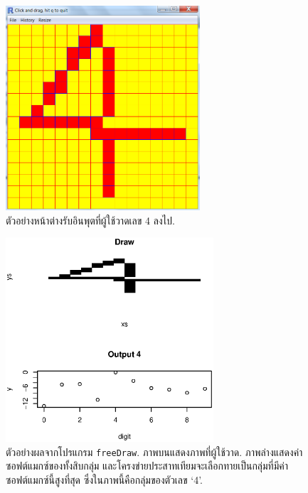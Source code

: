 %
\begin{figure}
\begin{center}
\includegraphics[height=3in]{04ANNAppImg/freeDrawPad.png}
\end{center}
\caption{ตัวอย่างหน้าต่างรับอินพุตที่ผู้ใช้วาดเลข 4 ลงไป.}
\label{fig: ANN freedraw pad}
\end{figure}
%

%
\begin{figure}
\begin{center}
\includegraphics[height=3in]{04ANNAppImg/freeDrawResult.eps}
\end{center}
\caption{ตัวอย่างผลจากโปรแกรม \texttt{freeDraw}. 
ภาพบนแสดงภาพที่ผู้ใช้วาด.
ภาพล่างแสดงค่าซอฟต์แมกซ์ของทั้งสิบกลุ่ม และโครงข่ายประสาทเทียมจะเลือกทายเป็นกลุ่มที่มีค่าซอฟต์แมกซ์นี้สูงที่สุด ซึ่งในภาพนี้คือกลุ่มของตัวเลข `4'.}
\label{fig: ANN freedraw results}
\end{figure}
%


